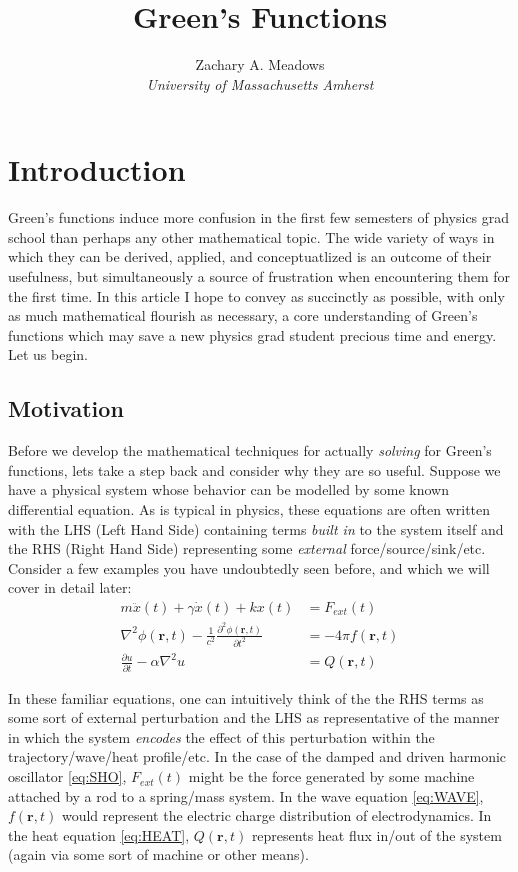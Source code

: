 \documentclass[11pt]{article}
\theoremstyle{plain}
\theoremstyle{definition}
\renewcommand{\vec}[1]{\mathbf{#1}} %
\begin{document}
\title{Green's Functions}
\author{Zachary A. Meadows \\ \textit{University of Massachusetts Amherst}}
\maketitle
\tableofcontents

\section{Introduction}

Green's functions induce more confusion in the first few semesters of physics grad school than perhaps any other mathematical topic. The wide variety of ways in which they can be derived, applied, and conceptuatlized is an outcome of their usefulness, but simultaneously a source of frustration when encountering them for the first time. In this article I hope to convey as succinctly as possible, with only as much mathematical flourish as necessary, a core understanding of Green's functions which may save a new physics grad student precious time and energy. Let us begin.

\subsection{Motivation}
Before we develop the mathematical techniques for actually \textit{solving} for Green's functions, lets take a step back and consider why they are so useful. Suppose we have a physical system whose behavior can be modelled by some known differential equation. As is typical in physics, these equations are often written with the LHS (Left Hand Side) containing terms \textit{built in} to the system itself and the RHS (Right Hand Side) representing some \textit{external} force/source/sink/etc. Consider a few examples you have undoubtedly seen before, and which we will cover in detail later:
%
\begin{align}
    m\ddot x(t) + \gamma \dot x(t) + kx(t) &= F_{ext}(t) \label{eq:SHO} \\
    \nabla^2 \phi(\vec r, t) - \frac{1}{c^2}\frac{\partial^2 \phi(\vec r, t)}{\partial t^2} &= -4\pi f(\vec r, t) \label{eq:WAVE} \\
    \frac{\partial u}{\partial t} - \alpha \nabla^2 u &= Q(\vec r, t) \label{eq:HEAT}
\end{align}

In these familiar equations, one can intuitively think of the the RHS terms as some sort of external perturbation and the LHS as representative of the manner in which the system \textit{encodes} the effect of this perturbation within the trajectory/wave/heat profile/etc. In the case of the damped and driven harmonic oscillator \eqref{eq:SHO}, $F_{ext}(t)$ might be the force generated by some machine attached by a rod to a spring/mass system. In the wave equation \eqref{eq:WAVE}, $f(\vec r,t)$ would represent the electric charge distribution of electrodynamics. In the heat equation \eqref{eq:HEAT}, $Q(\vec r, t)$ represents heat flux in/out of the system (again via some sort of machine or other means).
\end{document}

